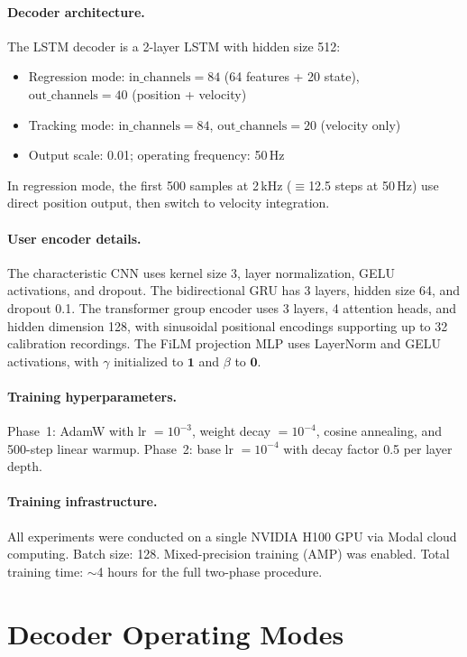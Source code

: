 \documentclass[10pt]{article}
\begin{document}
\paragraph{Decoder architecture.}
The LSTM decoder is a 2-layer LSTM with hidden size 512:
\begin{itemize}[leftmargin=*,itemsep=1pt]
    \item Regression mode: $\text{in\_channels}{=}84$ (64 features + 20 state), $\text{out\_channels}{=}40$ (position + velocity)
    \item Tracking mode: $\text{in\_channels}{=}84$, $\text{out\_channels}{=}20$ (velocity only)
    \item Output scale: 0.01; operating frequency: 50\,Hz
\end{itemize}
In regression mode, the first 500 samples at 2\,kHz ($\equiv$12.5 steps at 50\,Hz) use direct position output, then switch to velocity integration.

\paragraph{User encoder details.}
The characteristic CNN uses kernel size 3, layer normalization, GELU activations, and dropout. The bidirectional GRU has 3 layers, hidden size 64, and dropout 0.1. The transformer group encoder uses 3 layers, 4 attention heads, and hidden dimension 128, with sinusoidal positional encodings supporting up to 32 calibration recordings. The FiLM projection MLP uses LayerNorm and GELU activations, with $\gamma$ initialized to $\mathbf{1}$ and $\beta$ to $\mathbf{0}$.

\paragraph{Training hyperparameters.}
Phase~1: AdamW with lr $= 10^{-3}$, weight decay $= 10^{-4}$, cosine annealing, and 500-step linear warmup. Phase~2: base lr $= 10^{-4}$ with decay factor 0.5 per layer depth.

\paragraph{Training infrastructure.}
All experiments were conducted on a single NVIDIA H100 GPU via Modal cloud computing. Batch size: 128. Mixed-precision training (AMP) was enabled. Total training time: $\sim$4 hours for the full two-phase procedure.

\section{Decoder Operating Modes}
\label{app:modes}
\end{document}
